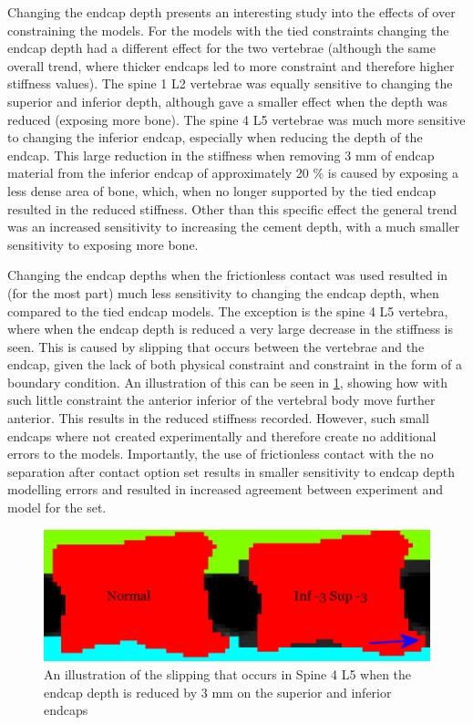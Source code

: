 Changing the endcap depth presents an interesting study into the effects of
over constraining the models. For the models with the tied constraints changing
the endcap depth had a different effect for the two vertebrae (although the
same overall trend, where thicker endcaps led to more constraint and therefore
higher stiffness values). The spine 1 L2 vertebrae was equally sensitive to
changing the superior and inferior depth, although gave a smaller effect when
the depth was reduced (exposing more bone). The spine 4 L5 vertebrae was much
more sensitive to changing the inferior endcap, especially when reducing the
depth of the endcap. This large reduction in the stiffness when removing 3 mm
of endcap material from the inferior endcap of approximately 20 \% is caused by
exposing a less dense area of bone, which, when no longer supported by the tied
endcap resulted in the reduced stiffness. Other than this specific effect the
general trend was an increased sensitivity to increasing the cement depth, with
a much smaller sensitivity to exposing more bone.

Changing the endcap depths when the frictionless contact was used resulted in
(for the most part) much less sensitivity to changing the endcap depth, when
compared to the tied endcap models. The exception is the spine 4 L5 vertebra,
where when the endcap depth is reduced a very large decrease in the stiffness
is seen. This is caused by slipping that occurs between the vertebrae and the
endcap, given the lack of both physical constraint and constraint in the form
of a boundary condition. An illustration of this can be seen in
\cref{fig:EC-3slip}, showing how with such little constraint the anterior
inferior of the vertebral body move further anterior. This results in the
reduced stiffness recorded. However, such small endcaps where not created
experimentally and therefore create no additional errors to the models.
Importantly, the use of frictionless contact with the no separation after
contact option set results in smaller sensitivity to endcap depth modelling
errors and resulted in increased agreement between experiment and model for the
set.


\begin{figure}[h!]
  \centering
\includegraphics[width=.65\textwidth]{Chapters/Chapter_HT_images/EC-3slip.png}
\caption{An illustration of the slipping that occurs in Spine 4 L5 when the
endcap depth is reduced by 3 mm on the superior and inferior endcaps}
	\label{fig:EC-3slip}
\end{figure}

